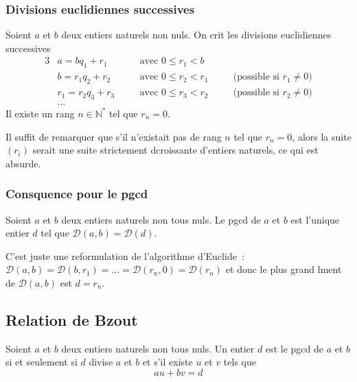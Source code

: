 \documentclass[a4paper,fleqn,openany]{trmbook}
\newcommand*{\N}{\mathbb{N}}
\newcommand*{\ensdiv}[1]{\mathcal{D}(#1)}
\begin{document}
\subsubsection{Divisions euclidiennes successives}

\begin{theoreme}
Soient $a$ et $b$ deux entiers naturels non nuls. On crit les divisions euclidiennes successives
\begin{alignat*}{3}
& a=bq_1+r_1 &\quad& \text{avec $0 \leq r_1 < b$} \\
& b=r_1q_2+r_2 &\quad& \text{avec $0 \leq r_2 < r_1$}&\quad& \text{(possible si $r_1 \neq 0$)} \\
& r_1=r_2q_3+r_3 &\quad& \text{avec $0 \leq r_3 < r_2$}&\quad& \text{(possible si $r_2 \neq 0$)}\\
& \dots
\end{alignat*}
Il existe un rang $n \in \N^*$ tel que $r_n = 0$.
\end{theoreme}

\begin{demonstration}
Il suffit de remarquer que s'il n'existait pas de rang $n$ tel que $r_n = 0$, alors la suite $(r_i)$ serait une suite strictement dcroissante d'entiers naturels, ce qui est absurde.
\end{demonstration}

\subsubsection{Consquence pour le pgcd}

\begin{corollaire}
Soient $a$ et $b$ deux entiers naturels non tous nuls. Le pgcd de $a$ et $b$ est l'unique entier $d$ tel que $\ensdiv{a,b} = \ensdiv{d}$.
\end{corollaire}

\begin{demonstration}
C'est juste une reformulation de l'algorithme d'Euclide~: $\ensdiv{a,b} = \ensdiv{b,r_1} = \dots = \ensdiv{r_n,0} = \ensdiv{r_n}$ et donc le plus grand lment de $\ensdiv{a,b}$ est $d = r_n$.
\end{demonstration}

\subsection{Relation de Bzout}

\begin{theoreme}
Soient $a$ et $b$ deux entiers naturels non tous nuls. Un entier $d$ est le pgcd de $a$ et $b$ si et seulement si $d$ divise $a$ et $b$ et s'il existe $u$ et $v$ tels que
\[au+bv=d\]
\end{theoreme}
\end{document}
